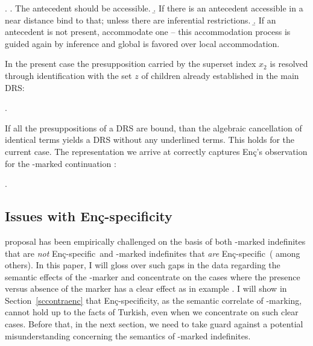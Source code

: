 \documentclass[11pt,a4paper]{article}
\newcommand{\encspec}{Enç-specific}
\begin{document}
\ex.
\a. The antecedent should be accessible.
\b. If there is an antecedent accessible in a near distance bind to
that; unless there are inferential restrictions.
\b. If an antecedent is not present, accommodate one -- this
accommodation process is guided again by inference and global
is favored over local accommodation.

In the present case the presupposition carried by the superset index $x_2$ is
resolved through identification with the set $z$ of children already
established in the main DRS:

\ex.


If all the presuppositions of a DRS are bound, than the algebraic
cancellation of identical terms yields a DRS without any underlined
terms. This holds for the current case. The representation we arrive
at correctly captures Enç's observation for the \acc-marked
continuation :

\ex.

\subsection{Issues with \encspec{ity}}

 proposal has been empirically challenged on the basis of
both \acc-marked indefinites that are \emph{not} \encspec\ and
\zero-marked indefinites that \emph{are} \encspec\
(
among others).  In this paper, I will gloss over such gaps in the data
regarding the semantic effects of the \acc-marker and concentrate on
the cases where the presence versus absence of the marker has a clear
effect as in \ctnms{enc91} example \xref{exenc}.  I will show
in Section~\ref{sccontraenc} that \encspec{ity}, as the semantic
correlate of \acc-marking, cannot hold up to the facts of Turkish,
even when we concentrate on such clear cases. Before that, in the next
section, we need to take guard against a potential misunderstanding
concerning the semantics of \acc-marked indefinites. 

\end{document}
